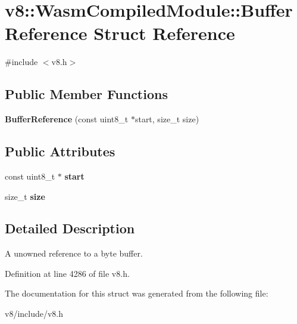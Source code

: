 \hypertarget{structv8_1_1WasmCompiledModule_1_1BufferReference}{}\section{v8\+:\+:Wasm\+Compiled\+Module\+:\+:Buffer\+Reference Struct Reference}
\label{structv8_1_1WasmCompiledModule_1_1BufferReference}


{\ttfamily \#include $<$v8.\+h$>$}

\subsection*{Public Member Functions}
\begin{DoxyCompactItemize}
\item 
\mbox{\label{structv8_1_1WasmCompiledModule_1_1BufferReference_ad46931134873606a9847ca2b5c464ec7}} 
{\bfseries Buffer\+Reference} (const uint8\+\_\+t $\ast$start, size\+\_\+t size)
\end{DoxyCompactItemize}
\subsection*{Public Attributes}
\begin{DoxyCompactItemize}
\item 
\mbox{\label{structv8_1_1WasmCompiledModule_1_1BufferReference_a9ac4a0945b75f31d78b7b799571d1c62}} 
const uint8\+\_\+t $\ast$ {\bfseries start}
\item 
\mbox{\label{structv8_1_1WasmCompiledModule_1_1BufferReference_a8ea480c872a380496cd7f44c56f542cf}} 
size\+\_\+t {\bfseries size}
\end{DoxyCompactItemize}


\subsection{Detailed Description}
A unowned reference to a byte buffer. 

Definition at line 4286 of file v8.\+h.



The documentation for this struct was generated from the following file\+:\begin{DoxyCompactItemize}
\item 
v8/include/v8.\+h\end{DoxyCompactItemize}
